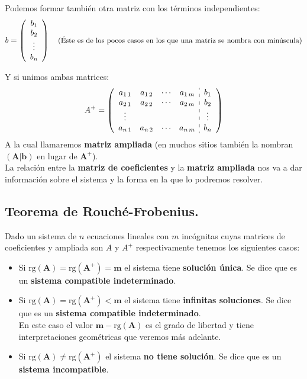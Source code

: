 \documentclass[a4paper,11pt,answers]{exam}
\newcommand\rango[1]{\mathrm{rg}(#1)}
\begin{document}
Podemos formar también otra matriz con los términos independientes:
\[b=\left(\begin{array}{c}
	b_1\\
	b_2\\
	\vdots\\
	b_n
\end{array}\right)\quad\text{\small (Éste es de los pocos casos en los que una matriz se nombra con minúscula)}\]

Y si unimos ambas matrices:
\[A^+= \left(
\begin{array}{cccc:c}%
	a_{1\,1}& a_{1\,2}&\cdots&a_{1\,m}&b_1\\
	a_{2\,1}&a_{2\,2}&\cdots&a_{2\,m}&b_2\\
	\vdots&&&&\vdots\\
	a_{n\,1}& a_{n\,2}&\cdots&a_{n\,m}&b_n
\end{array}
\right)\]
A la cual llamaremos \textbf{matriz ampliada} (en muchos sitios también la nombran $\boldsymbol{(A|b)}$ en lugar de $\boldsymbol{A^+}$).\\

La relación entre la \textbf{matriz de coeficientes} y la \textbf{matriz ampliada} nos va a dar información sobre el sistema y la forma en la que lo podremos resolver.

\subsection{Teorema de Rouché-Frobenius.}
Dado un sistema de $n$ ecuaciones lineales con $m$ incógnitas cuyas matrices de coeficientes y ampliada son $A$ y $A^+$ respectivamente tenemos los siguientes casos:
\begin{itemize}
	\item Si $\boldsymbol{\rango{A} = \rango{A^+} = m}$ el sistema tiene \textbf{solución única}. Se dice que es un \textbf{sistema compatible indeterminado}.
	\item Si $\boldsymbol{\rango{A} = \rango{A^+} < m}$ el sistema tiene \textbf{infinitas soluciones}. Se dice que es un \textbf{sistema compatible indeterminado}.\\
	En este caso el valor $\boldsymbol{m-\rango{A}}$ es el grado de libertad y tiene interpretaciones geométricas que veremos más adelante.
	\item Si $\boldsymbol{\rango{A} \neq \rango{A^+}}$ el sistema \textbf{no tiene solución}. Se dice que es un \textbf{sistema incompatible}.
\end{itemize}
\end{document}
